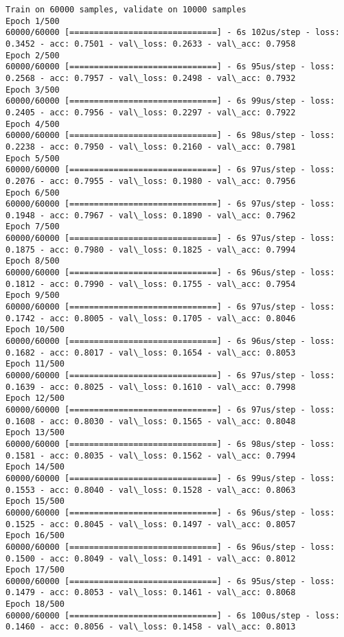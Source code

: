 \documentclass[11pt]{article}
\begin{document}
    \begin{Verbatim}[commandchars=\\\{\}]
Train on 60000 samples, validate on 10000 samples
Epoch 1/500
60000/60000 [==============================] - 6s 102us/step - loss: 0.3452 - acc: 0.7501 - val\_loss: 0.2633 - val\_acc: 0.7958
Epoch 2/500
60000/60000 [==============================] - 6s 95us/step - loss: 0.2568 - acc: 0.7957 - val\_loss: 0.2498 - val\_acc: 0.7932
Epoch 3/500
60000/60000 [==============================] - 6s 99us/step - loss: 0.2405 - acc: 0.7956 - val\_loss: 0.2297 - val\_acc: 0.7922
Epoch 4/500
60000/60000 [==============================] - 6s 98us/step - loss: 0.2238 - acc: 0.7950 - val\_loss: 0.2160 - val\_acc: 0.7981
Epoch 5/500
60000/60000 [==============================] - 6s 97us/step - loss: 0.2076 - acc: 0.7955 - val\_loss: 0.1980 - val\_acc: 0.7956
Epoch 6/500
60000/60000 [==============================] - 6s 97us/step - loss: 0.1948 - acc: 0.7967 - val\_loss: 0.1890 - val\_acc: 0.7962
Epoch 7/500
60000/60000 [==============================] - 6s 97us/step - loss: 0.1875 - acc: 0.7980 - val\_loss: 0.1825 - val\_acc: 0.7994
Epoch 8/500
60000/60000 [==============================] - 6s 96us/step - loss: 0.1812 - acc: 0.7990 - val\_loss: 0.1755 - val\_acc: 0.7954
Epoch 9/500
60000/60000 [==============================] - 6s 97us/step - loss: 0.1742 - acc: 0.8005 - val\_loss: 0.1705 - val\_acc: 0.8046
Epoch 10/500
60000/60000 [==============================] - 6s 96us/step - loss: 0.1682 - acc: 0.8017 - val\_loss: 0.1654 - val\_acc: 0.8053
Epoch 11/500
60000/60000 [==============================] - 6s 97us/step - loss: 0.1639 - acc: 0.8025 - val\_loss: 0.1610 - val\_acc: 0.7998
Epoch 12/500
60000/60000 [==============================] - 6s 97us/step - loss: 0.1608 - acc: 0.8030 - val\_loss: 0.1565 - val\_acc: 0.8048
Epoch 13/500
60000/60000 [==============================] - 6s 98us/step - loss: 0.1581 - acc: 0.8035 - val\_loss: 0.1562 - val\_acc: 0.7994
Epoch 14/500
60000/60000 [==============================] - 6s 99us/step - loss: 0.1553 - acc: 0.8040 - val\_loss: 0.1528 - val\_acc: 0.8063
Epoch 15/500
60000/60000 [==============================] - 6s 96us/step - loss: 0.1525 - acc: 0.8045 - val\_loss: 0.1497 - val\_acc: 0.8057
Epoch 16/500
60000/60000 [==============================] - 6s 96us/step - loss: 0.1500 - acc: 0.8049 - val\_loss: 0.1491 - val\_acc: 0.8012
Epoch 17/500
60000/60000 [==============================] - 6s 95us/step - loss: 0.1479 - acc: 0.8053 - val\_loss: 0.1461 - val\_acc: 0.8068
Epoch 18/500
60000/60000 [==============================] - 6s 100us/step - loss: 0.1460 - acc: 0.8056 - val\_loss: 0.1458 - val\_acc: 0.8013

\end{Verbatim}
\end{document}

